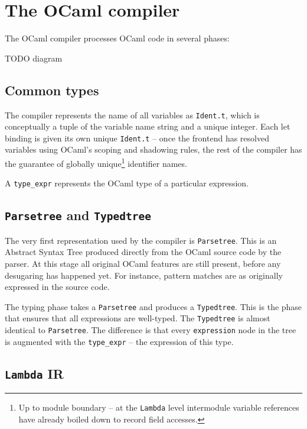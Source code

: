 \documentclass[12pt,a4paper,twoside,openright]{report}
\begin{document}
\section{The OCaml compiler}

The OCaml compiler processes OCaml code in several phases:

TODO diagram

\subsection{Common types}\label{common-types}

The compiler represents the name of all variables as \lstinline!Ident.t!, which
is conceptually a tuple of the variable name string and a unique integer. Each
let binding is given its own unique \lstinline!Ident.t! -- once the frontend
has resolved variables using OCaml's scoping and shadowing rules, the rest of
the compiler has the guarantee of globally unique\footnote{Up to module
boundary -- at the \lstinline!Lambda! level intermodule variable references
have already boiled down to record field accesses.} identifier names.

A \lstinline!type_expr! represents the OCaml type of a particular expression.

\subsection{\texttt{Parsetree} and \texttt{Typedtree}}

The very first representation used by the compiler is \lstinline!Parsetree!.
This is an Abstract Syntax Tree produced directly from the OCaml source code by
the parser. At this stage all original OCaml features are still present, before
any desugaring has happened yet. For instance, pattern matches are as
originally expressed in the source code.

The typing phase takes a \lstinline!Parsetree! and produces a
\lstinline!Typedtree!. This is the phase that ensures that all expressions are
well-typed. The \lstinline!Typedtree! is almost identical to
\lstinline!Parsetree!. The difference is that every \lstinline!expression! node
in the tree is augmented with the \lstinline!type_expr! -- the expression of
this type.

\subsection{\texttt{Lambda} IR}
\end{document}
